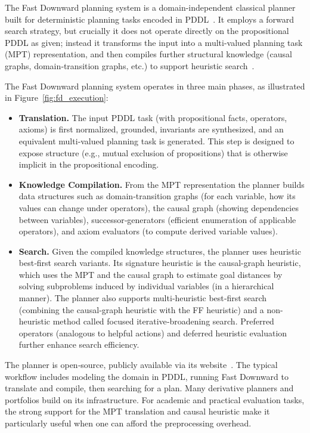 \documentclass[12pt]{extarticle}
\begin{document}
The Fast Downward planning system is a domain-independent classical planner built for deterministic planning tasks encoded in PDDL~\cite{the-fast-downward-planning-system}. It employs a forward search strategy, but crucially it does not operate directly on the propositional PDDL as given; instead it transforms the input into a multi-valued planning task (MPT) representation, and then compiles further structural knowledge (causal graphs, domain‐transition graphs, etc.) to support heuristic search~\cite{the-fast-downward-planning-system}.

\bigskip

The Fast Downward planning system operates in three main phases, as illustrated in Figure~\ref{fig:fd_execution}:

\begin{itemize}
\item \textbf{Translation.} The input PDDL task (with propositional facts, operators, axioms) is first normalized, grounded, invariants are synthesized, and an equivalent multi‐valued planning task is generated. This step is designed to expose structure (e.g., mutual exclusion of propositions) that is otherwise implicit in the propositional encoding.
\item \textbf{Knowledge Compilation.} From the MPT representation the planner builds data structures such as domain‐transition graphs (for each variable, how its values can change under operators), the causal graph (showing dependencies between variables), successor‐generators (efficient enumeration of applicable operators), and axiom evaluators (to compute derived variable values).
\item \textbf{Search.} Given the compiled knowledge structures, the planner uses heuristic best‐first search variants. Its signature heuristic is the causal-graph heuristic, which uses the MPT and the causal graph to estimate goal distances by solving subproblems induced by individual variables (in a hierarchical manner). The planner also supports multi‐heuristic best‐first search (combining the causal‐graph heuristic with the FF heuristic) and a non-heuristic method called focused iterative‐broadening search. Preferred operators (analogous to helpful actions) and deferred heuristic evaluation further enhance search efficiency.
\end{itemize}

\bigskip

The planner is open‐source, publicly available via its website~\cite{fast-downward-website}. The typical workflow includes modeling the domain in PDDL, running Fast Downward to translate and compile, then searching for a plan. Many derivative planners and portfolios build on its infrastructure. For academic and practical evaluation tasks, the strong support for the MPT translation and causal heuristic make it particularly useful when one can afford the preprocessing overhead.
\end{document}
